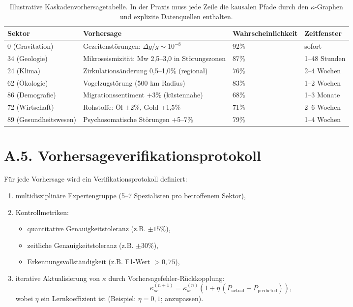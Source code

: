 \documentclass[13pt,a4paper]{article}
\begin{document}
	\begin{table}[htbp]
		\centering
		\small
		\begin{tabular}{p{}p{}p{}p{}}
			\toprule
			\textbf{Sektor} & \textbf{Vorhersage} & \textbf{Wahrscheinlichkeit} & \textbf{Zeitfenster} \\
			\midrule
			0 (Gravitation) & Gezeitenstörungen: $\Delta g/g \sim 10^{-8}$ & 92\% & sofort \\
			34 (Geologie) & Mikroseismizität: Mw 2,5--3,0 in Störungszonen & 87\% & 1--48 Stunden \\
			24 (Klima) & Zirkulationsänderung 0,5--1,0\% (regional) & 76\% & 2--4 Wochen \\
			62 (Ökologie) & Vogelzugstörung (500 km Radius) & 83\% & 1--2 Wochen \\
			86 (Demografie) & Migrationssentiment +3\% (küstennahe) & 68\% & 1--3 Monate \\
			72 (Wirtschaft) & Rohstoffe: Öl $\pm 2\%$, Gold +1,5\% & 71\% & 2--6 Wochen \\
			89 (Gesundheitswesen) & Psychosomatische Störungen +5--7\% & 79\% & 1--4 Wochen \\
			\bottomrule
		\end{tabular}
		\caption{Illustrative Kaskadenvorhersagetabelle. In der Praxis muss jede Zeile die kausalen Pfade durch den $\kappa$-Graphen und explizite Datenquellen enthalten.}
	\end{table}
	
	\section*{A.5. Vorhersageverifikationsprotokoll}
	
	Für jede Vorhersage wird ein Verifikationsprotokoll definiert:
	\begin{enumerate}[leftmargin=*]
		\item multidisziplinäre Expertengruppe (5--7 Spezialisten pro betroffenem Sektor),
		\item Kontrollmetriken:
		\begin{itemize}[leftmargin=*]
			\item quantitative Genauigkeitstoleranz (z.B. $\pm 15\%$),
			\item zeitliche Genauigkeitstoleranz (z.B. $\pm 30\%$),
			\item Erkennungsvollständigkeit (z.B. F1-Wert $>0,75$),
		\end{itemize}
		\item iterative Aktualisierung von $\kappa$ durch Vorhersagefehler-Rückkopplung:
		\[ \kappa_{sr}^{(n+1)}=\kappa_{sr}^{(n)}\left(1+\eta\,(P_{\mathrm{actual}}-P_{\mathrm{predicted}})\right), \]
		wobei $\eta$ ein Lernkoeffizient ist (Beispiel: $\eta=0,1$; anzupassen).
	\end{enumerate}
	
\end{document}
